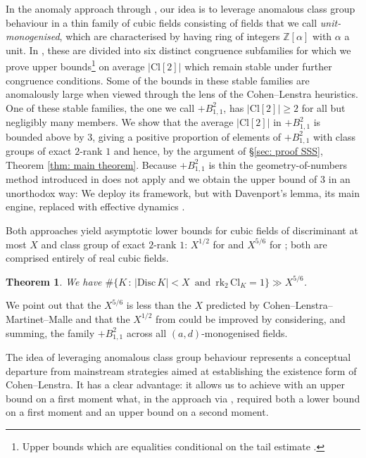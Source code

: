 \documentclass[a4paper, 12pt]{amsart}
\newcommand{\rk}{\mathrm{rk}}
\newtheorem{theorem}{Theorem}
\newcommand{\Cl}{\mathrm{Cl}}
\begin{document}
In the anomaly approach through \cite{MR4891959}, our idea is to leverage anomalous class group behaviour in a thin family of cubic fields consisting of fields that we call \textit{unit-monogenised}, which are characterised by having ring of integers $\mathbb{Z}[\alpha]$ with $\alpha$ a unit. 
In \cite{MR4891959}, these are divided into six distinct congruence subfamilies for which we prove upper bounds\footnote{Upper bounds which are equalities conditional on the tail estimate \cite[Remark 5.5]{MR4891959}.} on average $\rvert \Cl[2] \vert$ which remain stable under further congruence conditions. 
Some of the bounds in these stable families are anomalously large when viewed through the lens of the Cohen--Lenstra heuristics.
One of these stable families, the one we call $+B_{1,1}^2$, has $\lvert \Cl[2] \rvert \ge 2$ for all but negligibly many members.
We show that the average $\lvert \Cl[2] \rvert$ in $+B_{1,1}^2$ is bounded above by $3$, giving a positive proportion of elements of $+B_{1,1}^2$ with class groups of exact $2$-rank $1$ and hence, by the argument of \S \ref{sec: proof SSS}, Theorem \ref{thm: main theorem}. 
Because $+B_{1,1}^2$ is thin the geometry-of-numbers method introduced in \cite{MR2183288} does not apply and we obtain the upper bound of $3$ in an unorthodox way: We deploy its framework, but with Davenport's lemma, its main engine, replaced with effective dynamics \cite{MR3025156}.

Both approaches yield asymptotic lower bounds for cubic fields of discriminant at most $X$ and class group of exact $2$-rank $1$: $X^{1/2}$ for \cite{MR4891959} and $X^{5/6}$ for \cite{2506.05539}; both are comprised entirely of real cubic fields.

\begin{theorem} \label{thm: quantitative main theorem}
    We have $\#\{K \, \colon \, \lvert \mathrm{Disc} \, K \rvert < X \, \textrm{ and } \, \rk_2 \, \Cl_K = 1 \} \gg X^{5/6}$.
\end{theorem}

We point out that the $X^{5/6}$ is less than the $X$ predicted by Cohen--Lenstra--Martinet--Malle and that the $X^{1/2}$ from \cite{MR4891959} could be improved by considering, and summing, the family $+B_{1,1}^2$ across all $(a,d)$-monogenised fields.


The idea of leveraging anomalous class group behaviour represents a conceptual departure from mainstream strategies aimed at establishing the existence form of Cohen--Lenstra. It has a clear advantage: it allows us to achieve with an upper bound on a first moment what, in the approach via \cite{2506.05539}, required both a lower bound on a first moment and an upper bound on a second moment.
\end{document}
